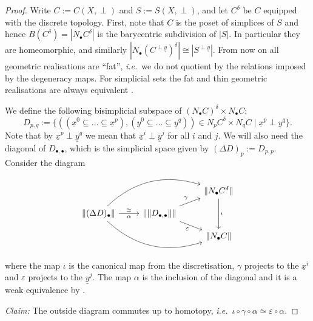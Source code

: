 \documentclass{amsart}
\theoremstyle{plain}
\theoremstyle{definition}
\renewcommand{\ul}[1]{\underline{#1}}
\begin{document}
\begin{proof}
    Write $C := C(X, \perp)$ and $S := S(X, \perp)$,
    and let $C^\delta$ be $C$ equipped with the discrete topology.
    First, note that $C$ is the poset of simplices of $S$ and hence $B(C^\delta) = |N_\bullet C^\delta|$ is the barycentric subdivision of $|S|$.
    In particular they are homeomorphic, and similarly $|N_\bullet(C^{\perp \ul{y}})^\delta| \cong |S^{\perp \ul{y}}|$.
    From now on all geometric realisations are ``fat'', \emph{i.e.}~we do not quotient by the relations imposed by the degeneracy maps.
    For simplicial sets the fat and thin geometric realisations are always equivalent \cite[Lemma 1.7]{EbertRandalWilliams}.
    
    We define the following bisimplicial subspace of $(N_\bullet C)^\delta \times N_\bullet C$:
    \[
        D_{p,q} := \{ ((\ul{x}^0 \subseteq \dots \subseteq \ul{x}^p),(\ul{y}^0 \subseteq \dots \subseteq \ul{y}^q)) \in N_p C^\delta \times N_q C \;|\; \ul{x}^p \perp \ul{y}^q \}.
    \]
    Note that by $\ul{x}^p \perp \ul{y}^q$ we mean that $\ul{x}^i \perp \ul{y}^j$ for all $i$ and $j$.
    We will also need the diagonal of $D_{\bullet, \bullet}$, which is the simplicial space given by 
    $(\Delta D)_p := D_{p,p}$.
    Consider the diagram
    \[
        \begin{tikzcd}[row sep = small]
            && {\|N_\bullet C^\delta\|} \ar[dd, "\iota"] \\
            {\|(\Delta D)_\bullet\|} \ar[r, "\alpha"', "\simeq"] \ar[rru, bend left] \ar[rrd, bend right] & {\|\| D_{\bullet, \bullet} \|\|} \ar[dr, "\varepsilon"'] \ar[ur, "\gamma"] & \\
            && {\|N_\bullet C\|} 
        \end{tikzcd}
    \]
    where the map $\iota$ is the canonical map from the discretisation,
    $\gamma$ projects to the $\ul{x}^i$ and $\varepsilon$ projects to the $\ul{y}^j$.
    The map $\alpha$ is the inclusion of the diagonal and it is a weak equivalence by \cite[Theorem 7.1]{EbertRandalWilliams}.
    
    \noindent
    \textit{Claim:}
    The outside diagram commutes up to homotopy, \emph{i.e.}~$\iota \circ \gamma \circ \alpha \simeq \varepsilon \circ \alpha$.
    

\end{proof}
\end{document}
